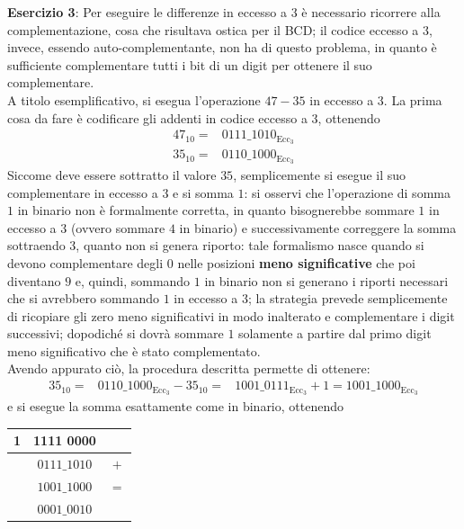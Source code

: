 \documentclass[a4paper]{extarticle}
\renewcommand\arraystretch{}
\begin{document}
\vspace{1em}
\noindent
\textbf{Esercizio 3}: Per eseguire le differenze in eccesso a $3$ è necessario ricorrere alla complementazione, cosa che risultava ostica per il BCD; il codice eccesso a $3$, invece, essendo auto-complementante, non ha di questo problema, in quanto è sufficiente complementare tutti i bit di un digit per ottenere il suo complementare.\\
A titolo esemplificativo, si esegua l'operazione $47-35$ in eccesso a $3$. La prima cosa da fare è codificare gli addenti in codice eccesso a $3$, ottenendo
\begin{align*}
    47_{10} = & 0111\_1010_{\text{Ecc}_3}\\
    35_{10} = & 0110\_1000_{\text{Ecc}_3}
\end{align*}
Siccome deve essere sottratto il valore $35$, semplicemente si esegue il suo complementare in eccesso a $3$ e si somma $1$: si osservi che l'operazione di somma $1$ in binario non è formalmente corretta, in quanto bisognerebbe sommare $1$ in eccesso a $3$ (ovvero sommare $4$ in binario) e successivamente correggere la somma sottraendo $3$, quanto non si genera riporto: tale formalismo nasce quando si devono complementare degli $0$ nelle posizioni \textbf{meno significative} che poi diventano $9$ e, quindi, sommando $1$ in binario non si generano i riporti necessari che si avrebbero sommando $1$ in eccesso a $3$; la strategia prevede semplicemente di ricopiare gli zero meno significativi in modo inalterato e complementare i digit successivi; dopodiché si dovrà sommare $1$ solamente a partire dal primo digit meno significativo che è stato complementato.\\
Avendo appurato ciò, la procedura descritta permette di ottenere:
\begin{align*}
    35_{10} = & 0110\_1000_{\text{Ecc}_3}
    -35_{10} = & 1001\_0111_{\text{Ecc}_3} + 1 = 1001\_1000_{\text{Ecc}_3}
\end{align*}
e si esegue la somma esattamente come in binario, ottenendo

\noindent
\begin{table}[H]
\setlength{\tabcolsep}{4pt}
\renewcommand{\arraystretch}{1.2}
\centering
\begin{tabular}{ccc}
   1 & 1111 0000 & \\
    \hline
    &$0111\_1010$ & $+$\\
    \hline
    &$1001\_1000$ & $=$\\
    \hline
    &$0001\_0010$ & \\
\end{tabular}
\end{table}
\end{document}
